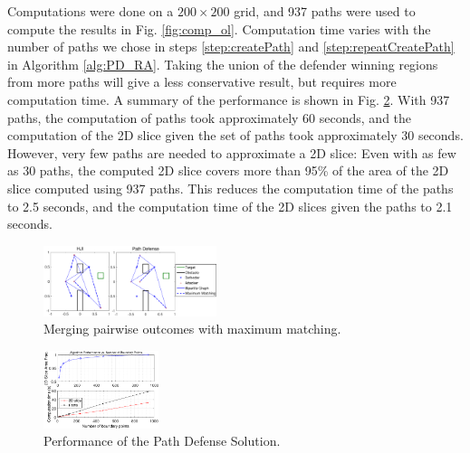 Computations were done on a $200\times200$ grid, and 937 paths were used to compute the results in Fig. \ref{fig:comp_ol}. Computation time varies with the number of paths we chose in steps \ref{step:createPath} and \ref{step:repeatCreatePath} in Algorithm \ref{alg:PD_RA}. Taking the union of the defender winning regions from more paths will give a less conservative result, but requires more computation time. A summary of the performance is shown in Fig. \ref{fig:pd_perf}. With 937 paths, the computation of paths took approximately 60 seconds, and the computation of the 2D slice given the set of paths took approximately 30 seconds. However, very few paths are needed to approximate a 2D slice: Even with as few as 30 paths, the computed 2D slice covers more than 95\% of the area of the 2D slice computed using 937 paths. This reduces the computation time of the paths to 2.5 seconds, and the computation time of the 2D slices given the paths to 2.1 seconds.



\begin{figure}
	\centering
	\includegraphics[width=0.45\textwidth]{"fig/OLGame_mm_results"}
	\caption{Merging pairwise outcomes with maximum matching.}
	\label{fig:mm}
\end{figure}

\begin{figure}
	\centering
	\includegraphics[width=0.3\textwidth]{"fig/alg_perf_Rc"}
	\caption{Performance of the Path Defense Solution.}
	\label{fig:pd_perf}
\end{figure}

